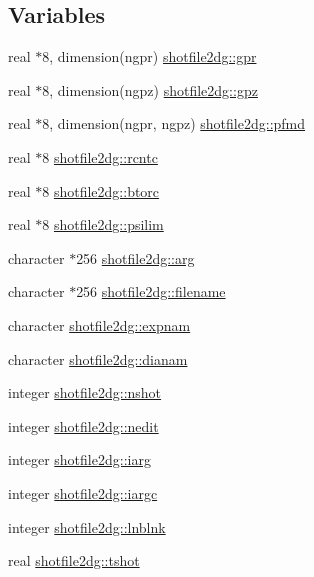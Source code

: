 \subsection*{Variables}
\begin{CompactItemize}
\item 
real $\ast$8, dimension(ngpr) \hyperlink{namespaceshotfile2dg_c50fc1ef94233e32cc1a55c910fd9037}{shotfile2dg::gpr}
\item 
real $\ast$8, dimension(ngpz) \hyperlink{namespaceshotfile2dg_4175f5215674a1c9bade7bf6ba900feb}{shotfile2dg::gpz}
\item 
real $\ast$8, dimension(ngpr, ngpz) \hyperlink{namespaceshotfile2dg_244c205e85803307a067220a9149a277}{shotfile2dg::pfmd}
\item 
real $\ast$8 \hyperlink{namespaceshotfile2dg_519caa04c862ac70905e9cb264d156b0}{shotfile2dg::rcntc}
\item 
real $\ast$8 \hyperlink{namespaceshotfile2dg_86c17dafb5ef893787c9df16f528735b}{shotfile2dg::btorc}
\item 
real $\ast$8 \hyperlink{namespaceshotfile2dg_3d5fc7ba6a17fbbe538f7c4d2b3138cc}{shotfile2dg::psilim}
\item 
character $\ast$256 \hyperlink{namespaceshotfile2dg_b698b727537e2ab7d94d5ec0c44b62f6}{shotfile2dg::arg}
\item 
character $\ast$256 \hyperlink{namespaceshotfile2dg_a8cbd5f464c93ce3054f69959f54f24f}{shotfile2dg::filename}
\item 
character \hyperlink{namespaceshotfile2dg_035718019994ef0564c4ef1e6fbe1477}{shotfile2dg::expnam}
\item 
character \hyperlink{namespaceshotfile2dg_1c6b6dc13c91c970234997299500e842}{shotfile2dg::dianam}
\item 
integer \hyperlink{namespaceshotfile2dg_e24378204407e119ddc87122265ea324}{shotfile2dg::nshot}
\item 
integer \hyperlink{namespaceshotfile2dg_aba5c8cf053397dddeded69b88f887e2}{shotfile2dg::nedit}
\item 
integer \hyperlink{namespaceshotfile2dg_5c10817ab16ac4db9ccc26ac2ce08d88}{shotfile2dg::iarg}
\item 
integer \hyperlink{namespaceshotfile2dg_ac2982c024cdf54d82169a44531a3e7f}{shotfile2dg::iargc}
\item 
integer \hyperlink{namespaceshotfile2dg_8d49fa9517af47ec3a8cb815e2484ab3}{shotfile2dg::lnblnk}
\item 
real \hyperlink{namespaceshotfile2dg_c8db051db6516dbce57bfcf43cebcd46}{shotfile2dg::tshot}

\end{CompactItemize}
